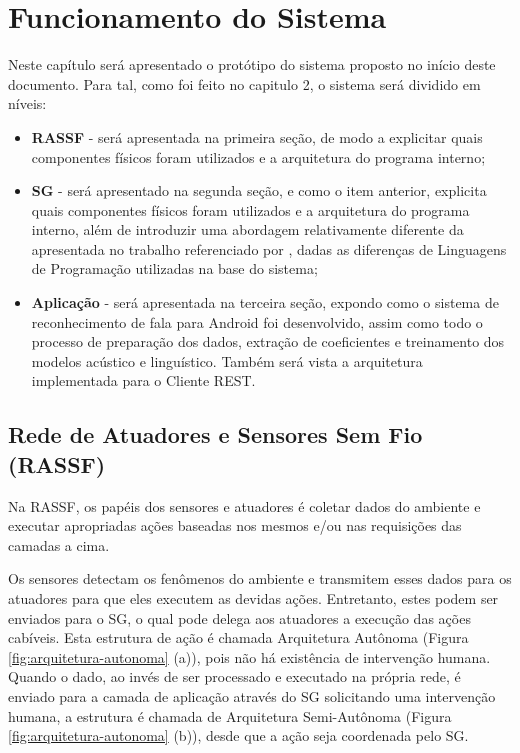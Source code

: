 \documentclass[12pt,a4paper,oneside]{report}
\begin{document}
\chapter{Funcionamento do Sistema}
\label{chap:funcionamento}

Neste capítulo será apresentado o protótipo do sistema proposto no início deste documento. Para tal, como foi feito no capitulo 2, o sistema será dividido em níveis:

\begin{itemize}
    \item \textbf{RASSF} - será apresentada na primeira seção, de modo a explicitar quais componentes físicos foram utilizados e a arquitetura do programa interno;
    \item \textbf{SG} - será apresentado na segunda seção, e como o item anterior, explicita quais componentes físicos foram utilizados e a arquitetura do programa interno, além de introduzir uma abordagem relativamente diferente da apresentada no trabalho referenciado por \cite{sgtriwiguiboh}, dadas as diferenças de Linguagens de Programação utilizadas na base do sistema;
    \item \textbf{Aplicação} -  será apresentada na terceira seção, expondo como o sistema de reconhecimento de fala para Android foi desenvolvido, assim como todo o processo de preparação dos dados, extração de coeficientes e treinamento dos modelos acústico e linguístico. Também será vista a arquitetura implementada para o Cliente REST.
\end{itemize}

\section{Rede de Atuadores e Sensores Sem Fio (RASSF)}

Na RASSF, os papéis dos sensores e atuadores é coletar dados do ambiente e executar apropriadas ações baseadas nos mesmos e/ou nas requisições das camadas a cima.

Os sensores detectam os fenômenos do ambiente e transmitem esses dados para os atuadores para que eles executem as devidas ações. Entretanto, estes podem ser enviados para o SG, o qual pode delega aos atuadores a execução das ações cabíveis. Esta estrutura de ação é chamada Arquitetura Autônoma (Figura \ref{fig:arquitetura-autonoma} (a)), pois não há existência de intervenção humana. Quando o dado, ao invés de ser processado e executado na própria rede, é enviado para a camada de aplicação através do SG solicitando uma intervenção humana, a estrutura é chamada de Arquitetura Semi-Autônoma (Figura \ref{fig:arquitetura-autonoma} (b)), desde que a ação seja coordenada pelo SG.
\end{document}
